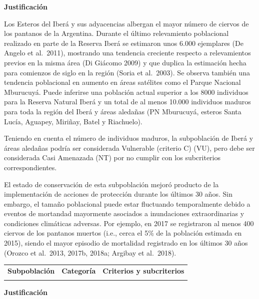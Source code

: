 \documentclass[
  x11names]{article}
\begin{document}
\textbf{Justificación}

Los Esteros del Iberá y sus adyacencias albergan el mayor número de
ciervos de los pantanos de la Argentina. Durante el último relevamiento
poblacional realizado en parte de la Reserva Iberá se estimaron unos
6.000 ejemplares (De Angelo et al.~2011), mostrando una tendencia
creciente respecto a relevamientos previos en la misma área (Di Giácomo
2009) y que duplica la estimación hecha para comienzos de siglo en la
región (Soria et al.~2003). Se observa también una tendencia poblacional
en aumento en áreas satélites como el Parque Nacional Mburucuyá. Puede
inferirse una población actual superior a los 8000 individuos para la
Reserva Natural Iberá y un total de al menos 10.000 individuos maduros
para toda la región del Iberá y áreas aledañas (PN Mburucuyá, esteros
Santa Lucía, Aguapey, Miriñay, Batel y Riachuelo).

Teniendo en cuenta el número de individuos maduros, la subpoblación de
Iberá y áreas aledañas podría ser considerada Vulnerable (criterio C)
(VU), pero debe ser considerada Casi Amenazada (NT) por no cumplir con
los subcriterios correspondientes.

El estado de conservación de esta subpoblación mejoró producto de la
implementación de acciones de protección durante los últimos 30 años.
Sin embargo, el tamaño poblacional puede estar fluctuando temporalmente
debido a eventos de mortandad mayormente asociados a inundaciones
extraordinarias y condiciones climáticas adversas. Por ejemplo, en 2017
se registraron al menos 400 ciervos de los pantanos muertos (i.e., cerca
el 5\% de la población estimada en 2015), siendo el mayor episodio de
mortalidad registrado en los últimos 30 años (Orozco et al.~2013, 2017b,
2018a; Argibay et al.~2018).\vspace{0.5cm}

\begin{tabu} to 
\toprule
\textbf{Subpoblación} & \textbf{Categoría} & \textbf{Criterios y subcriterios}\\
\midrule
{} &  & \\
\bottomrule
\end{tabu}

\textbf{Justificación}
\end{document}
